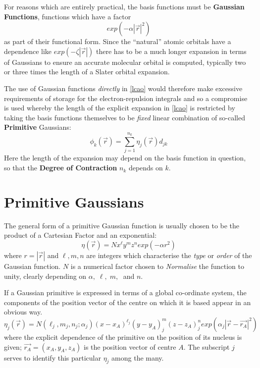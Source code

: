 For reasons which are entirely practical, the basis functions
must be {\bf Gaussian Functions}, functions which have a factor
\[
exp( -\alpha |\vec{r}|^2)
\]
as part of their functional form. Since the ``natural''
atomic orbitals have a dependence like $exp(-\zeta |\vec{r}| ) $
there has to be a much longer expansion in terms of Gaussians to
ensure an accurate molecular orbital is computed, typically two or three
times the length of a Slater orbital expansion.

The use of Gaussian functions {\em directly} in
\ref{lcao} would therefore make excessive requirements of
storage for the electron-repulsion integrals and so a compromise
is used whereby the length of the explicit expansion in \ref{lcao}
is restricted by taking the basis functions themselves to
be {\em fixed} linear combination of so-called {\bf Primitive}
Gaussians:
\begin{equation}
\phi_k (\vec{r}) = \sum_{j=1}^{n_k} { \eta_j (\vec{r}) d_{jk} }
\label{lcprim}
\end{equation}
Here the length of the expansion may depend on the basis
function in question, so that the {\bf Degree of Contraction}
$n_k$ depends on $k$.
\section{\sf Primitive Gaussians}
\label{prims}
The general form of a primitive Gaussian function is usually
chosen to be the product of a Cartesian Factor and an exponential:
\begin{equation}
\eta(\vec{r}) = N x^{\ell} y^{m} z^{n} exp(- \alpha r^2 )
\end{equation}
where $ r = | \vec{r} |$ and $\ell, m, n$ are integers which characterise
the {\em type} or {\em order} of the Gaussian function. $N$ is a numerical
factor chosen to {\em Normalise} the function to unity, clearly depending
on $\alpha, \; \ell, \; m, \; $ and $n$.

If a Gaussian primitive is expressed in terms of a global co-ordinate
system, the components of the position vector of the centre on which
it is based appear in an obvious way.
\begin{equation}
\eta_j (\vec{r}) = N( \ell_j , m_j , n_j ; \alpha_j ) 
(x-x_A )^{\ell_j} ( y - y_A )^m_j ( z - z_A )^n_j 
exp( \alpha_j | \vec{r} - \vec{r_{A}} |^2 )
\end{equation}
where the explicit dependence of the primitive on the position
of its nucleus is given; $\vec{r_A} =(x_A , y_A , z_A )$ is the position
vector of centre $A$. The subscript $j$ serves to identify this
particular $\eta_j$ among the many.

